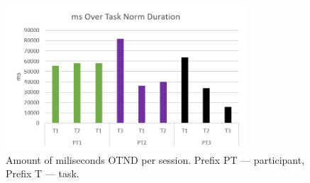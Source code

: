 \begin{figure}[htb]
	\centering
	\includegraphics[width=0.8\textwidth]{figures/msOverTaskNorm.png}
	\caption[OTND of all sessions.]{Amount of miliseconds OTND per session. Prefix PT --- participant, Prefix T --- task.}
	\label{fig:tct}
\end{figure}

